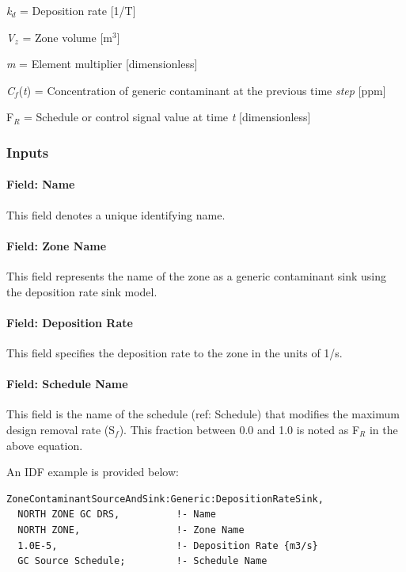 \emph{k\(_{d}\)} = Deposition rate {[}1/T{]}

\emph{V\(_{z}\)} = Zone volume {[}m\(^{3}\){]}

\emph{m} = Element multiplier {[}dimensionless{]}

\emph{C}\(_{f}\)(\emph{t}) = Concentration of generic contaminant at the previous time \emph{step} {[}ppm{]}

F\(_{R}\) = Schedule or control signal value at time \emph{t} {[}dimensionless{]}

\subsubsection{Inputs}\label{inputs-17-003}

\paragraph{Field: Name}\label{field-name-17-003}

This field denotes a unique identifying name.

\paragraph{Field: Zone Name}\label{field-zone-name-6-002}

This field represents the name of the zone as a generic contaminant sink using the deposition rate sink model.

\paragraph{Field: Deposition Rate}\label{field-deposition-rate}

This field specifies the deposition rate to the zone in the units of 1/s.

\paragraph{Field: Schedule Name}\label{field-schedule-name-10}

This field is the name of the schedule (ref: Schedule) that modifies the maximum design removal rate (S\(_{f}\)). This fraction between 0.0 and 1.0 is noted as F\(_{R}\) in the above equation.

An IDF example is provided below:

\begin{lstlisting}
ZoneContaminantSourceAndSink:Generic:DepositionRateSink,
  NORTH ZONE GC DRS,          !- Name
  NORTH ZONE,                 !- Zone Name
  1.0E-5,                     !- Deposition Rate {m3/s}
  GC Source Schedule;         !- Schedule Name
\end{lstlisting}

